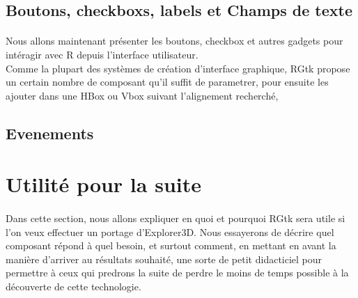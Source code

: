 \documentclass{article}
\begin{document}
\subsection{Boutons, checkboxs, labels et Champs de texte}
\paragraph{} 
Nous allons maintenant présenter les boutons, checkbox et autres gadgets pour intéragir avec R depuis l'interface utilisateur. \\
Comme la plupart des systèmes de création d'interface graphique, RGtk propose un certain nombre de composant qu'il suffit de parametrer, pour ensuite les ajouter dans une HBox ou Vbox suivant l'alignement recherché, 		

\subsection{Evenements }


\section{Utilité pour la suite}
\paragraph{}
Dans cette section, nous allons expliquer en quoi et pourquoi RGtk sera utile si l'on veux effectuer un portage d'Explorer3D. Nous essayerons de décrire quel composant répond à quel besoin, et surtout comment, en mettant en avant la manière d'arriver au résultats souhaité, une sorte de petit didacticiel pour permettre à ceux qui predrons la suite de perdre le moins de temps possible à la découverte de cette technologie.
\end{document}
